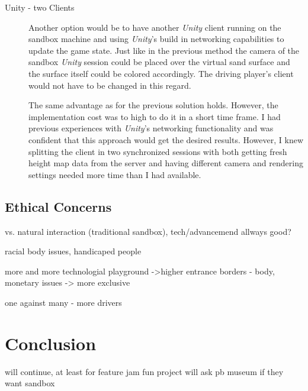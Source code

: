 \documentclass[12pt,a4paper,twoside,titlepage,headsepline,numbers=noenddot,listof=totoc,index=totoc,bibliography=totoc]{scrartcl}
\theoremstyle{break}
\begin{document}
\begin{description}
	\item[Unity - two Clients] Another option would be to have another \textit{Unity} client running on the sandbox machine and using \textit{Unity}'s build in networking capabilities to update the game state. Just like in the previous method the camera of the sandbox \textit{Unity} session could be placed over the virtual sand surface and the surface itself could be colored accordingly. The driving player's client would not have to be changed in this regard.
	
	The same advantage as for the previous solution holds. However, the implementation cost was to high to do it in a short time frame. I had previous experiences with \textit{Unity}'s networking functionality and was confident that this approach would get the desired results. However, I knew splitting the client in two synchronized sessions with both getting fresh height map data from the server and having different camera and rendering settings needed more time than I had available.
\end{description}

\subsection{Ethical Concerns}
vs. natural interaction (traditional sandbox), tech/advancemend allways good?

racial body issues, handicaped people

more and more technologial playground ->higher entrance borders - body, monetary issues -> more exclusive 

one against many - more drivers

\section{Conclusion}

will continue, at least for feature jam
fun project
will ask pb museum if they want sandbox


\end{document}

